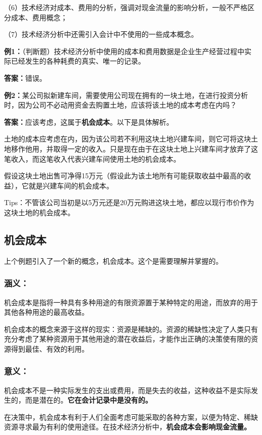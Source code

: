 （6）技术经济对成本、费用的分析，强调对现金流量的影响分析，一般不严格区分成本、费用概念；

（7）技术经济分析中还需引入会计中不使用的一些成本概念。

\textbf{例1：}（判断题）技术经济分析中使用的成本和费用数据是企业生产经营过程中实际已经发生的各种耗费的真实、唯一的记录。

\textbf{答案：}错误。

\textbf{例2：}某公司拟新建车间，需要使用公司现在拥有的一块土地，在进行投资分析时，因为公司不必动用资金去购置土地，应该将该土地的成本考虑在内吗？

\textbf{答案：}应该考虑，这属于\textbf{机会成本}。以下是具体解析。

土地的成本应考虑在内，因为该公司若不利用这块土地兴建车间，则它可将这块土地移作他用，并取得一定的收入。只是现在由于在这块土地上兴建车间才放弃了这笔收入，而这笔收入代表兴建车间使用土地的机会成本。

假设这块土地出售可净得15万元（假设此为该土地所有可能获取收益中最高的收益），它就是兴建车间的机会成本。

Tips：不管该公司当初是以5万元还是20万元购进这块土地，都应以现行市价作为这块土地的机会成本。

\subsection{机会成本}
上个例题引入了一个新的概念，机会成本。这个是需要理解并掌握的。

\subsubsection{涵义：}
机会成本是指将一种具有多种用途的有限资源置于某种特定的用途，而放弃的用于其他各种用途的最高收益。

机会成本的概念来源于这样的现实：资源是稀缺的。资源的稀缺性决定了人类只有充分考虑了某种资源用于其他用途的潜在收益后，才能作出正确的决策使有限的资源得到最佳、有效的利用。

\subsubsection{意义：}
机会成本不是一种实际发生的支出或费用，而是失去的收益，这种收益不是实际发生的，而是潜在的。\textbf{它在会计记录中是没有的。}

在决策中，机会成本有利于人们全面考虑可能采取的各种方案，以便为特定、稀缺资源寻求最为有利的使用途径。在技术经济分析中，\textbf{机会成本会影响现金流量。}

